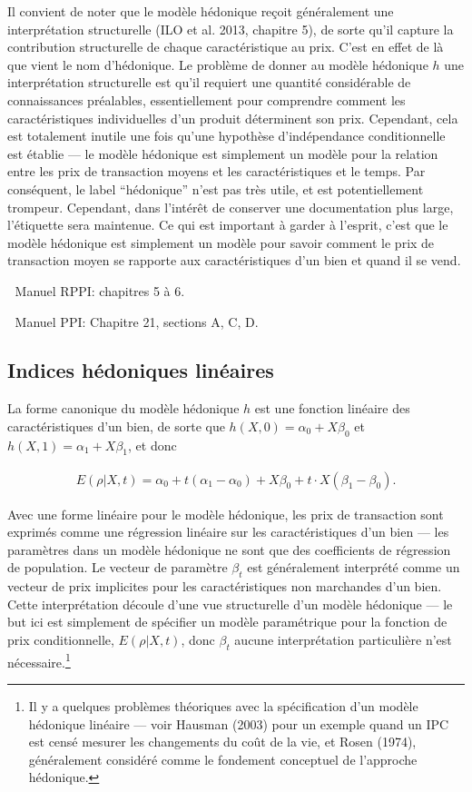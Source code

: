 \documentclass[]{article}
\begin{document}
Il convient de noter que le modèle hédonique reçoit généralement une interprétation structurelle (ILO et al. 2013, chapitre 5), de sorte qu'il capture la contribution structurelle de chaque caractéristique au prix. C'est en effet de là que vient le nom d'hédonique. Le problème de donner au modèle hédonique \(h\) une interprétation structurelle est qu'il requiert une quantité considérable de connaissances préalables, essentiellement pour comprendre comment les caractéristiques individuelles d'un produit déterminent son prix. Cependant, cela est totalement inutile une fois qu'une hypothèse d'indépendance conditionnelle est établie --- le modèle hédonique est simplement un modèle pour la relation entre les prix de transaction moyens et les caractéristiques et le temps. Par conséquent, le label ``hédonique'' n'est pas très utile, et est potentiellement trompeur. Cependant, dans l'intérêt de conserver une documentation plus large, l'étiquette sera maintenue. Ce qui est important à garder à l'esprit, c'est que le modèle hédonique est simplement un modèle pour savoir comment le prix de transaction moyen se rapporte aux caractéristiques d'un bien et quand il se vend.

📖 Manuel RPPI: chapitres 5 à 6.

📖 Manuel PPI: Chapitre 21, sections A, C, D.

\hypertarget{indices-huxe9doniques-linuxe9aires}{%
\subsection{Indices hédoniques linéaires}\label{indices-huxe9doniques-linuxe9aires}}

La forme canonique du modèle hédonique \(h\) est une fonction linéaire des caractéristiques d'un bien, de sorte que \(h(X, 0) = \alpha_{0} + X \beta_{0}\) et \(h(X, 1) = \alpha_{1} + X \beta_{1}\), et donc

\begin{align*}
E(\rho | X, t) = \alpha_{0} + t (\alpha_{1} - \alpha_{0}) + X \beta_{0} + t \cdot X (\beta_{1} - \beta_{0}).
\end{align*}

Avec une forme linéaire pour le modèle hédonique, les prix de transaction sont exprimés comme une régression linéaire sur les caractéristiques d'un bien --- les paramètres dans un modèle hédonique ne sont que des coefficients de régression de population. Le vecteur de paramètre \(\beta_{t}\) est généralement interprété comme un vecteur de prix implicites pour les caractéristiques non marchandes d'un bien. Cette interprétation découle d'une vue structurelle d'un modèle hédonique --- le but ici est simplement de spécifier un modèle paramétrique pour la fonction de prix conditionnelle, \(E(\rho | X, t)\), donc \(\beta_{t}\) aucune interprétation particulière n'est nécessaire.\footnote{Il y a quelques problèmes théoriques avec la spécification d'un modèle hédonique linéaire --- voir Hausman (2003) pour un exemple quand un IPC est censé mesurer les changements du coût de la vie, et Rosen (1974), généralement considéré comme le fondement conceptuel de l'approche hédonique.}
\end{document}
